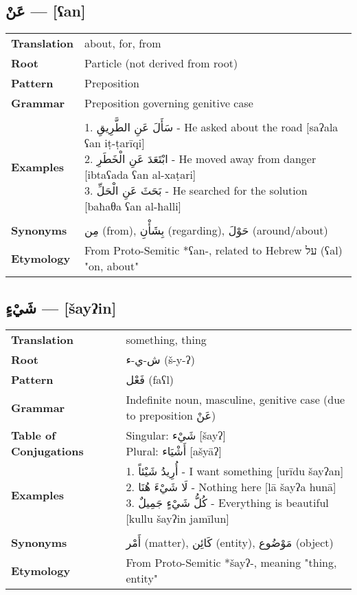 \documentclass[letterpaper,12pt]{article}
\begin{document}
\subsection{\textarabic{عَنْ} — [ʕan]}
\begin{tabular}{p{3cm}p{10cm}}
\toprule

\textbf{Translation} & about, for, from \\
\textbf{Root} & Particle (not derived from root) \\
\textbf{Pattern} & Preposition \\
\textbf{Grammar} & Preposition governing genitive case \\
\midrule \\
\textbf{Examples} & \makecell[l]{\parbox{9.5cm}{
1. \textarabic{سَأَلَ عَنِ الطَّرِيقِ} - He asked about the road [saʔala ʕan iṭ-ṭarīqi]\\
2. \textarabic{ابْتَعَدَ عَنِ الْخَطَرِ} - He moved away from danger [ibtaʕada ʕan al-xaṭari]\\
3. \textarabic{بَحَثَ عَنِ الْحَلِّ} - He searched for the solution [baħaθa ʕan al-ħalli]
} } \\
\midrule \\
\textbf{Synonyms} & \textarabic{مِن} (from), \textarabic{بِشَأْنِ} (regarding), \textarabic{حَوْلَ} (around/about) \\
\textbf{Etymology} & From Proto-Semitic *ʕan-, related to Hebrew \texthebrew{על} (ʕal) "on, about" \\
\bottomrule
\end{tabular}

\subsection{\textarabic{شَيْءٍ} — [šayʔin]}
\begin{tabular}{p{3cm}p{10cm}}
\toprule

\textbf{Translation} & something, thing \\
\textbf{Root} & \textarabic{ش-ي-ء} (š-y-ʔ) \\
\textbf{Pattern} & \textarabic{فَعْل} (faʕl) \\
\textbf{Grammar} & Indefinite noun, masculine, genitive case (due to preposition \textarabic{عَنْ}) \\
\textbf{Table of Conjugations} & \makecell[l]{
Singular: \textarabic{شَيْء} [šayʔ]\\
Plural: \textarabic{أَشْيَاء} [ašyāʔ]
} \\
\textbf{Examples} & \makecell[l]{\parbox{9.5cm}{
1. \textarabic{أُرِيدُ شَيْئاً} - I want something [urīdu šayʔan]\\
2. \textarabic{لَا شَيْءَ هُنَا} - Nothing here [lā šayʔa hunā]\\
3. \textarabic{كُلُّ شَيْءٍ جَمِيلٌ} - Everything is beautiful [kullu šayʔin jamīlun]
}} \\
\midrule \\
\textbf{Synonyms} & \textarabic{أَمْر} (matter), \textarabic{كَائِن} (entity), \textarabic{مَوْضُوع} (object) \\
\textbf{Etymology} & From Proto-Semitic *šayʔ-, meaning "thing, entity" \\
\bottomrule
\end{tabular}
\end{document}

